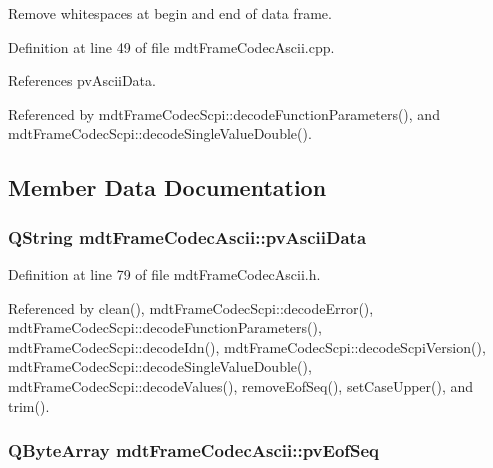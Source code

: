 Remove whitespaces at begin and end of data frame. 



Definition at line 49 of file mdt\-Frame\-Codec\-Ascii.\-cpp.



References pv\-Ascii\-Data.



Referenced by mdt\-Frame\-Codec\-Scpi\-::decode\-Function\-Parameters(), and mdt\-Frame\-Codec\-Scpi\-::decode\-Single\-Value\-Double().



\subsection{Member Data Documentation}
\hypertarget{classmdt_frame_codec_ascii_a1f912b05801a0db32c9fca0f2450bdb1}{
\subsubsection[{pv\-Ascii\-Data}]{\setlength{\rightskip}{0pt plus 5cm}Q\-String mdt\-Frame\-Codec\-Ascii\-::pv\-Ascii\-Data\hspace{0.3cm}{\ttfamily [protected]}}}\label{classmdt_frame_codec_ascii_a1f912b05801a0db32c9fca0f2450bdb1}


Definition at line 79 of file mdt\-Frame\-Codec\-Ascii.\-h.



Referenced by clean(), mdt\-Frame\-Codec\-Scpi\-::decode\-Error(), mdt\-Frame\-Codec\-Scpi\-::decode\-Function\-Parameters(), mdt\-Frame\-Codec\-Scpi\-::decode\-Idn(), mdt\-Frame\-Codec\-Scpi\-::decode\-Scpi\-Version(), mdt\-Frame\-Codec\-Scpi\-::decode\-Single\-Value\-Double(), mdt\-Frame\-Codec\-Scpi\-::decode\-Values(), remove\-Eof\-Seq(), set\-Case\-Upper(), and trim().

\hypertarget{classmdt_frame_codec_ascii_ad44132c4e3db292c71831111da748c7a}{
\subsubsection[{pv\-Eof\-Seq}]{\setlength{\rightskip}{0pt plus 5cm}Q\-Byte\-Array mdt\-Frame\-Codec\-Ascii\-::pv\-Eof\-Seq\hspace{0.3cm}{\ttfamily [protected]}}}\label{classmdt_frame_codec_ascii_ad44132c4e3db292c71831111da748c7a}


